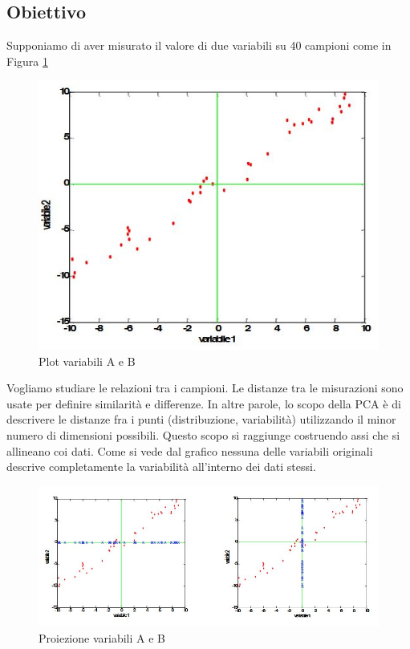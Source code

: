 \documentclass[12pt]{article}
\begin{document}
	\subsection{Obiettivo}
		Supponiamo di aver misurato il valore di due variabili su 40 campioni come in Figura \ref{fig:plot1} 
		\begin{figure}[H]
			\begin{center}
				\includegraphics[scale=.5]{plotTeoria}
				\caption{Plot variabili A e B}
				\label{fig:plot1}
			\end{center}
		\end{figure}
		Vogliamo studiare le relazioni tra i campioni. Le distanze tra le misurazioni sono usate per definire similarità e differenze. In altre parole, lo scopo della \ac{PCA} è di descrivere le distanze fra i punti (distribuzione, variabilità) utilizzando il minor numero di dimensioni possibili. Questo scopo si raggiunge costruendo assi che si allineano coi dati. Come si vede dal grafico nessuna delle variabili originali descrive completamente la variabilità all’interno dei dati stessi. 
		\begin{figure}[H]
			\begin{center}
				\includegraphics[scale=.6]{proiezione}
				\caption{Proiezione variabili A e B}
				\label{fig:proiezione}
			\end{center}
		\end{figure}
\end{document}
